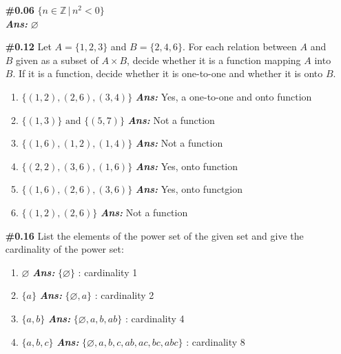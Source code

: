 \documentclass[12pt]{article}
\newcommand{\sol}{\setlength{\parindent}{0cm}\textbf{\textit{Ans:}}\setlength{\parindent}{1cm} }
\begin{document}
\begin{enumerate}[start=1,label={\bfseries Question \arabic*:},leftmargin=1in] %
  \item[\textbf{\#0.06}] $\{ n \in \mathbb{Z} \, | \, n^2 < 0 \}$\\
  \sol{$\varnothing$}
  
  \item [\textbf{\#0.12}]
  Let \( A = \{ 1, 2, 3 \} \) and \( B = \{ 2, 4, 6 \} \). For each relation between \( A \) and \( B \) given as a subset of \( A \times B \), decide whether it is a function mapping \( A \) into \( B \). If it is a function, decide whether it is one-to-one and whether it is onto \( B \).
  
  \begin{enumerate}[label=\alph*.]
      \item \( \{ (1, 2), (2, 6), (3, 4) \} \) \sol{Yes, a one-to-one and onto function}
      \item \( \{ (1, 3) \} \text{ and } \{ (5, 7) \} \) \sol{Not a function}
      \item \( \{ (1, 6), (1, 2), (1, 4) \} \) \sol{Not a function}
      \item \( \{ (2, 2), (3, 6), (1, 6) \} \) \sol{Yes, onto function}
      \item \( \{ (1, 6), (2, 6), (3, 6) \} \) \sol{Yes, onto functgion}
      \item \( \{ (1, 2), (2, 6) \} \) \sol{Not a function}
  \end{enumerate}

  \item [\textbf{\#0.16}]
  List the elements of the power set of the given set and give the cardinality of the power set:
  \begin{enumerate}[label=\alph*.]
      \item \( \varnothing \) \sol{$\{\varnothing\}$} : cardinality 1
      \item \( \{ a \} \) \sol{$\{\varnothing, a\}$} : cardinality 2
      \item \( \{ a, b \} \) \sol{$\{\varnothing, a, b, ab\}$} : cardinality 4
      \item \( \{ a, b, c \} \) \sol{$\{\varnothing, a, b, c, ab, ac, bc, abc\}$} : cardinality 8
  \end{enumerate}   


\end{enumerate}
\end{document}
